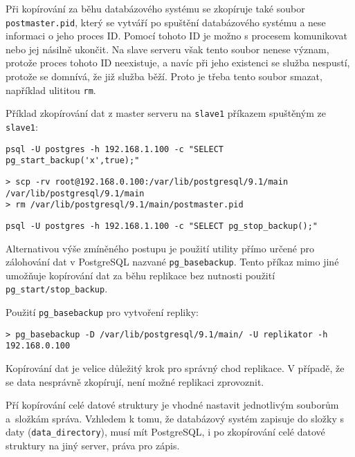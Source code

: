 Při kopírování za běhu databázového systému se zkopíruje také soubor \texttt{postmaster.pid}, který se vytváří po spuštění databázového systému a nese informaci o jeho proces ID. Pomocí tohoto ID je možno s procesem komunikovat nebo jej násilně ukončit. Na slave serveru však tento soubor nenese význam, protože proces tohoto ID neexistuje, a navíc při jeho existenci se služba nespustí, protože se domnívá, že již služba běží. Proto je třeba tento soubor smazat, například ulititou \texttt{rm}.

Příklad zkopírování dat z master serveru na \texttt{slave1} příkazem spuštěným ze \texttt{slave1}:
\begin{lstlisting} 
psql -U postgres -h 192.168.1.100 -c "SELECT pg_start_backup('x',true);"
\end{lstlisting}
\begin{lstlisting}[keywordstyle=\bfseries\color{purpurova7},identifierstyle=\color{black},stringstyle=\color{black}]
> scp -rv root@192.168.0.100:/var/lib/postgresql/9.1/main /var/lib/postgresql/9.1/main
> rm /var/lib/postgresql/9.1/main/postmaster.pid
\end{lstlisting}
\begin{lstlisting}
psql -U postgres -h 192.168.1.100 -c "SELECT pg_stop_backup();"
\end{lstlisting}

Alternativou výše zmíněného postupu je použití utility přímo určené pro zálohování dat v PostgreSQL nazvané \texttt{pg\_basebackup}. Tento příkaz mimo jiné umožňuje kopírování dat za běhu replikace bez nutnosti použití \texttt{pg\_start/stop\_backup}.

Použití \texttt{pg\_basebackup} pro vytvoření repliky:
\begin{lstlisting}[keywordstyle=\bfseries\color{purpurova7},identifierstyle=\color{black},stringstyle=\color{black}]
> pg_basebackup -D /var/lib/postgresql/9.1/main/ -U replikator -h 192.168.0.100
\end{lstlisting}

Kopírování dat je velice důležitý krok pro správný chod replikace. V případě, že se data nesprávně zkopírují, není možné replikaci zprovoznit. 

Pří kopírování celé datové struktury je vhodné nastavit jednotlivým souborům a~složkám správa. Vzhledem k tomu, že databázový systém zapisuje do složky s daty (\texttt{data\_directory}), musí mít PostgreSQL, i po zkopírování celé datové struktury na jiný server, práva pro zápis.

